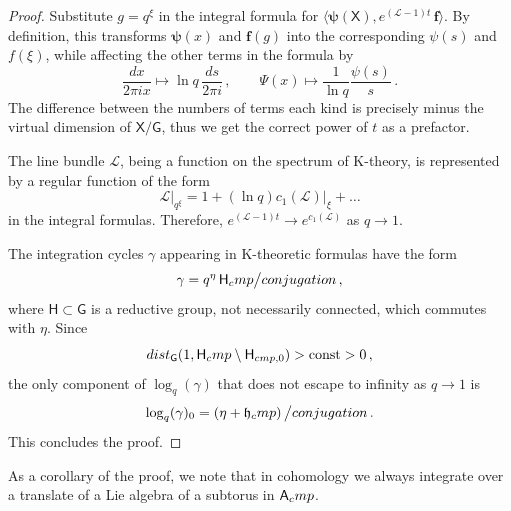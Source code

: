 \documentclass[14pt]{extarticle}
\newcommand{\bA}{\mathsf{A}}
\newcommand{\bG}{\mathsf{G}}
\newcommand{\bH}{\mathsf{H}}
\newcommand{\bX}{\mathsf{X}}
\newcommand{\cL}{\mathscr{L}}
\newcommand{\bpsi}{\boldsymbol{\psi}}
\newcommand{\fg}{\mathfrak{g}}
\newcommand{\fh}{\mathfrak{h}}
\newcommand{\Hd}{{H}^{\raisebox{0.5mm}{$\scriptscriptstyle \bullet$}}}
\newcommand{\fa}{\mathfrak{a}}
\newcommand{\comp}{\textup{cmp}}
\DeclareMathOperator{\Lie}{Lie}
\DeclareMathOperator{\const}{const}
\DeclareMathOperator{\pt}{pt}
\DeclareMathOperator{\Spec}{Spec}
\DeclareMathOperator{\expu}{\underline{\exp}}
\theoremstyle{definition}
\begin{document}
\begin{proof}
Substitute $g=q^\xi$ in the integral formula for $\langle \bpsi(\bX),
e^{(\cL-1)t} \, \boldsymbol{f}\rangle$. By definition, this transforms
$\bpsi(x)$ and $\boldsymbol{f}(g)$ into the corresponding $\psi(s)$
and $f(\xi)$, while affecting the other terms in the formula by
%
\begin{equation}
  \label{eq:156}
  \frac{dx}{2\pi i x} \mapsto \ln q \, \frac{ds}{2\pi i}\,, \qquad 
  \Psi(x) \mapsto \frac{1}{\ln q} \frac{\psi(s)}{s} \,.  
\end{equation}
%
The difference between the
numbers of terms each kind is precisely minus the virtual dimension of
$\bX/\bG$, thus we get the correct power of $t$ as a prefactor.

The line bundle $\cL$, being a function on the spectrum of K-theory,
is represented by a regular function of the form
\[
  \cL \big|_{q^\xi} = 1 + (\ln q ) c_1(\cL)\big|_{\xi} + \dots
\]
in the integral formulas. Therefore, $e^{(\cL-1)t}\to e^{c_1(\cL)}$ as
$q\to 1$. 

The integration cycles $\gamma$ appearing in K-theoretic formulas have
the form
\[
  \gamma = q^{\eta} \, \bH_\comp \big / \textup{conjugation}\,, 
\]
where $\bH \subset \bG$ is a reductive group, not necessarily
connected, which commutes with $\eta$. Since
\[
  \textup{dist}_\bG(1, \bH_\comp \setminus \bH_{\comp,0}) >
\const > 0 \,, 
\]
the only component of $\log_q(\gamma)$ that does not escape to infinity
as $q\to 1$ is
\[
  \log_q(\gamma)_0 = \left(\eta+ \fh_\comp \right) \big/
\textup{conjugation}\,.
\]
This concludes the proof.
\end{proof} 

As a corollary of the proof, we note that in cohomology we always
integrate over a translate of a Lie algebra of a subtorus in $\bA_\comp$. 





\end{document}
